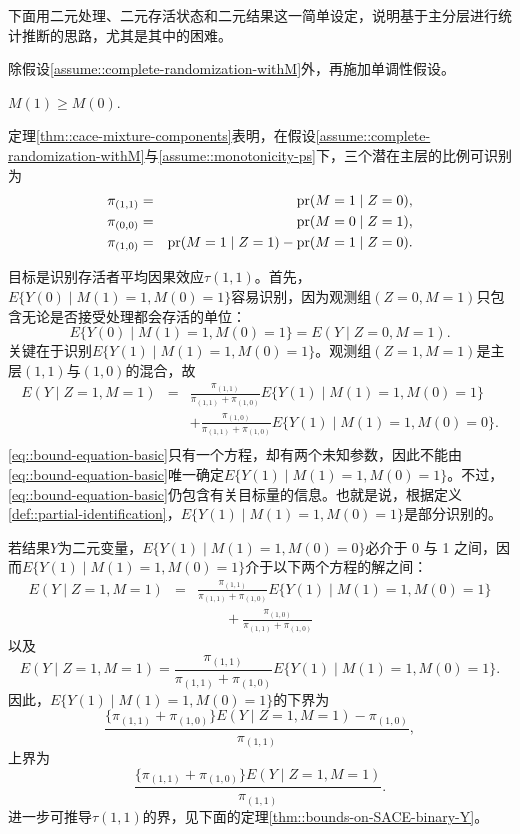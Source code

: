下面用二元处理、二元存活状态和二元结果这一简单设定，说明基于主分层进行统计推断的思路，尤其是其中的困难。


除假设\ref{assume::complete-randomization-withM}外，再施加单调性假设。

\begin{assumption}
[单调性]\label{assume::monotonicity-ps}
$M(1) \geq M(0)$.
\end{assumption}


定理\ref{thm::cace-mixture-components}表明，在假设\ref{assume::complete-randomization-withM}与\ref{assume::monotonicity-ps}下，三个潜在主层的比例可识别为
\begin{eqnarray*} 
 \pi_{(1,1)} &=& \textup{pr}(M=1\mid Z=0), \\
 \pi_{(0,0)} &=& \textup{pr}(M=0\mid Z=1), \\
 \pi_{(1,0)} &=& \textup{pr}(M=1\mid Z=1) - \textup{pr}(M=1\mid Z=0). 
\end{eqnarray*} 


目标是识别存活者平均因果效应$\tau(1,1)$。首先，$E\{ Y(0)\mid M(1) = 1, M(0)=1 \}$容易识别，因为观测组$(Z=0,M=1)$只包含无论是否接受处理都会存活的单位：
$$
E\{ Y(0)\mid M(1) = 1, M(0)=1 \} = E(Y\mid Z=0, M=1). 
$$
关键在于识别$E\{ Y(1)\mid M(1) = 1, M(0)=1 \}$。观测组$(Z=1,M=1)$是主层$(1,1)$与$(1,0)$的混合，故
\begin{eqnarray} 
E(Y\mid Z=1,M=1) 
&=& \frac{ \pi_{(1,1)}}{ \pi_{(1,1)} + \pi_{(1,0)}} E\{  Y(1)\mid   M(1)=1, M(0)=1 \} \nonumber  \\
&&+ \frac{ \pi_{(1,0)}}{ \pi_{(1,1)} + \pi_{(1,0)}} E\{  Y(1)\mid  M(1)=1, M(0)=0 \}. \nonumber  \\
&& \label{eq::bound-equation-basic}
\end{eqnarray}
\eqref{eq::bound-equation-basic}只有一个方程，却有两个未知参数，因此不能由\eqref{eq::bound-equation-basic}唯一确定$E\{  Y(1)\mid   M(1)=1, M(0)=1 \}$。不过，\eqref{eq::bound-equation-basic}仍包含有关目标量的信息。也就是说，根据定义\ref{def::partial-identification}，$E\{  Y(1)\mid   M(1)=1, M(0)=1 \}$是部分识别的。 



若结果$Y$为二元变量，$E\{  Y(1)\mid  M(1)=1, M(0)=0 \}$必介于 0 与 1 之间，因而$E\{  Y(1)\mid   M(1)=1, M(0)=1 \}$介于以下两个方程的解之间：
\begin{eqnarray*}
E(Y\mid Z=1,M=1) &=& \frac{ \pi_{(1,1)}}{ \pi_{(1,1)} + \pi_{(1,0)}} E\{  Y(1)\mid   M(1)=1, M(0)=1 \}  \\
&&\qquad + \frac{ \pi_{(1,0)}}{ \pi_{(1,1)} + \pi_{(1,0)}}  
\end{eqnarray*}
以及
$$
E(Y\mid Z=1,M=1) = \frac{ \pi_{(1,1)}}{ \pi_{(1,1)} + \pi_{(1,0)}} E\{  Y(1)\mid   M(1)=1, M(0)=1 \} .
$$
因此，$E\{  Y(1)\mid   M(1)=1, M(0)=1 \}$的下界为
$$
\frac{  \{  \pi_{(1,1)} + \pi_{(1,0)} \} E(Y\mid Z=1,M=1) - \pi_{(1,0)}}{ \pi_{(1,1)}},
$$
上界为
$$
\frac{  \{  \pi_{(1,1)} + \pi_{(1,0)} \} E(Y\mid Z=1,M=1)  }{ \pi_{(1,1)}} . 
$$
进一步可推导$\tau(1,1)$的界，见下面的定理\ref{thm::bounds-on-SACE-binary-Y}。



